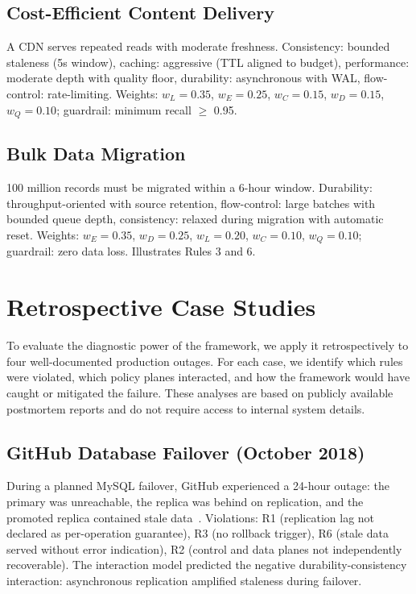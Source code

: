 \documentclass[conference]{IEEEtran}
\begin{document}
\subsection{Cost-Efficient Content Delivery}

A CDN serves repeated reads with moderate freshness. Consistency: bounded staleness (5s window), caching: aggressive (TTL aligned to budget), performance: moderate depth with quality floor, durability: asynchronous with WAL, flow-control: rate-limiting. Weights: $w_L=0.35$, $w_E=0.25$, $w_C=0.15$, $w_D=0.15$, $w_Q=0.10$; guardrail: minimum recall $\geq$ 0.95.

\subsection{Bulk Data Migration}

100 million records must be migrated within a 6-hour window. Durability: throughput-oriented with source retention, flow-control: large batches with bounded queue depth, consistency: relaxed during migration with automatic reset. Weights: $w_E=0.35$, $w_D=0.25$, $w_L=0.20$, $w_C=0.10$, $w_Q=0.10$; guardrail: zero data loss. Illustrates Rules 3 and 6.

\section{Retrospective Case Studies}
\label{sec:cases}

To evaluate the diagnostic power of the framework, we apply it retrospectively to four well-documented production outages. For each case, we identify which rules were violated, which policy planes interacted, and how the framework would have caught or mitigated the failure. These analyses are based on publicly available postmortem reports and do not require access to internal system details.

\subsection{GitHub Database Failover (October 2018)}

During a planned MySQL failover, GitHub experienced a 24-hour outage: the primary was unreachable, the replica was behind on replication, and the promoted replica contained stale data~\cite{github2018}. Violations: R1 (replication lag not declared as per-operation guarantee), R3 (no rollback trigger), R6 (stale data served without error indication), R2 (control and data planes not independently recoverable). The interaction model predicted the negative durability-consistency interaction: asynchronous replication amplified staleness during failover.
\end{document}
